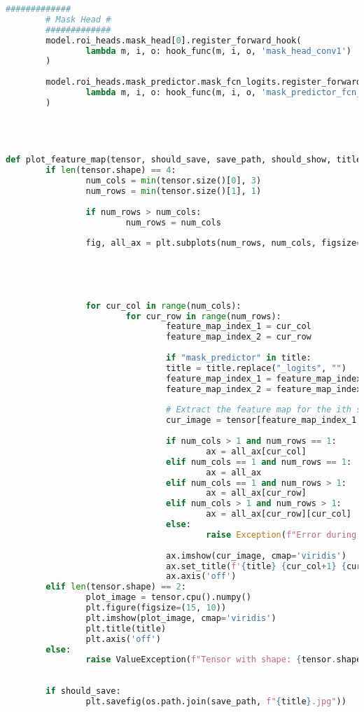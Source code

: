 \begin{lstlisting}[language=Python,caption=Hooking insight informations from Mask R-CNN, label=lst:inference-insight]
		#############
		# Mask Head #
		#############
		model.roi_heads.mask_head[0].register_forward_hook(
				lambda m, i, o: hook_func(m, i, o, 'mask_head_conv1')
		)
		
		model.roi_heads.mask_predictor.mask_fcn_logits.register_forward_hook(
				lambda m, i, o: hook_func(m, i, o, 'mask_predictor_fcn_logits')
		)




def plot_feature_map(tensor, should_save, save_path, should_show, title="Feature Map"):
		if len(tensor.shape) == 4:
				num_cols = min(tensor.size()[0], 3)
				num_rows = min(tensor.size()[1], 1)
				
				if num_rows > num_cols:
						num_rows = num_cols
				
				fig, all_ax = plt.subplots(num_rows, num_cols, figsize=(15, 10))
				
				
				
				
				
				for cur_col in range(num_cols):
						for cur_row in range(num_rows):
								feature_map_index_1 = cur_col
								feature_map_index_2 = cur_row
								
								if "mask_predictor" in title:
								title = title.replace("_logits", "")
								feature_map_index_1 = feature_map_index_1
								feature_map_index_2 = feature_map_index_2+1
								
								# Extract the feature map for the ith sample
								cur_image = tensor[feature_map_index_1, feature_map_index_2].detach().cpu().numpy()  # Select channel 0, detach from graph
								
								if num_cols > 1 and num_rows == 1:
										ax = all_ax[cur_col]
								elif num_cols == 1 and num_rows == 1:
										ax = all_ax
								elif num_cols == 1 and num_rows > 1:
										ax = all_ax[cur_row]
								elif num_cols > 1 and num_rows > 1:
										ax = all_ax[cur_row][cur_col]
								else:
										raise Exception(f"Error during col: {cur_col}, row: {cur_row}")
								
								ax.imshow(cur_image, cmap='viridis')
								ax.set_title(f'{title} {cur_col+1} {cur_row+1}')
								ax.axis('off')
		elif len(tensor.shape) == 2:
				plot_image = tensor.cpu().numpy()
				plt.figure(figsize=(15, 10))
				plt.imshow(plot_image, cmap='viridis')
				plt.title(title)
				plt.axis('off')
		else:
				raise ValueException(f"Tensor with shape: {tensor.shape} can't be plottet.")
		
		
		if should_save:
				plt.savefig(os.path.join(save_path, f"{title}.jpg"))
		

\end{lstlisting}
